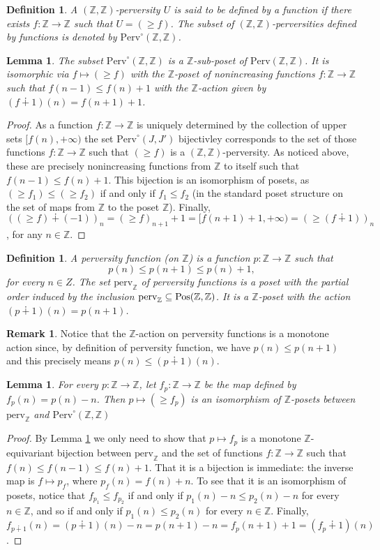 \documentclass{article}
\newtheorem{lem}[thm]{Lemma}
\newtheorem{defn}[thm]{Definition}
\theoremstyle{definition}
\newtheorem{rem}[thm]{Remark}
\newcommand{\Z}{\mathbb{Z}}
\newcommand{\pos}{\textnormal{Pos}}
\begin{document}
\begin{defn}
A $(\Z,\Z)$-perversity $U$ is said to be defined by a function if there exists $f\colon \Z\to \Z$ such that $U=(\geq f)$. The subset of $(\Z,\Z)$-perversities defined by functions is denoted by $\mathrm{Perv}^\circ(\Z,\Z)$.
\end{defn}
\begin{lem}\label{lemma.perv0}
The subset $\mathrm{Perv}^\circ(\Z,\Z)$ is a $\Z$-sub-poset of $\mathrm{Perv}(\Z,\Z)$. It is isomorphic via $f\mapsto (\geq f)$ with the $\Z$-poset of nonincreasing functions $f\colon \Z\to \Z$ such that $f(n-1)\leq f(n)+1$ with the $\Z$-action given by $(f\dotplus 1)(n)=f(n+1)+1$.
\end{lem}
\begin{proof}
As a function $f\colon \Z\to \Z$ is uniquely determined by the collection of upper sets $[f(n),+\infty)$ the set $\mathrm{Perv}^\circ(J,J')$ bijectivley corresponds to the set of those functions $f\colon \Z\to \Z$ such that $(\geq f)$ is a $(\Z,\Z)$-perversity. As noticed above, these are precisely nonincreasing functions from $\Z$ to itself such that  $f(n-1)\leq f(n)+1$. This bijection is an isomorphism of posets, as $(\geq f_1)\leq (\geq f_2)$ if and only if $f_1\leq f_2$ (in the standard poset structure on the set of maps from $\Z$ to the poset $\Z$). Finally, $((\geq f)\dotplus (-1))_n=(\geq f)_{n+1}+1=[f(n+1)+1,+\infty)=(\geq (f\dotplus 1))_n$, for any $n\in \Z$.
\end{proof}

\begin{defn}
A \emph{perversity function} (on $\Z$) is a function $p\colon \Z\to \Z$ such that
\[
p(n)\leq p(n+1)\leq p(n)+1,
\]
for every $n\in Z$. The set $\mathrm{perv}_\Z$ of perversity functions is a poset with the partial order induced by the inclusion $\mathrm{perv}_\Z\subseteq \pos(\Z,\Z)$. It is a $\Z$-poset with the action $(p\dotplus1)(n)=p(n+1)$. 
\end{defn}
\begin{rem}
Notice that the $\Z$-action on perversity functions is a monotone action since, by definition of perversity function, we have $p(n)\leq p(n+1)$ and this precisely means $p(n)\leq (p\dotplus1)(n)$.
\end{rem}
\begin{lem}
For every $p\colon \Z \to \Z$, let $f_p\colon \Z\to \Z$ be the map defined by $f_p(n)= p(n)-n$. Then $p\mapsto (\geq f_p)$ is an isomorphism of $\Z$-posets between $\mathrm{perv}_\Z$ and $\mathrm{Perv}^\circ(\Z,\Z)$
\end{lem}
\begin{proof}
By Lemma \ref{lemma.perv0} we only need to show that $p\mapsto f_p$ is a monotone $\Z$-equivariant bijection between  $\mathrm{perv}_\Z$ and the set of functions $f\colon \Z\to \Z$ such that $f(n)\leq f(n-1)\leq f(n)+1$. That it is a bijection is immediate: the inverse map is $f\mapsto p_f$, where $p_f(n)=f(n)+n$. To see that it is an isomorphism of posets, notice that $f_{p_1}\leq f_{p_2}$ if and only if $p_1(n)-n\leq p_2(n)-n$ for every $n\in \Z$, and so if and only if $p_1(n)\leq p_2(n)$ for every $n\in \Z$. Finally, $f_{p\dotplus1}(n)=(p\dotplus 1)(n)-n=p(n+1)-n=f_p(n+1)+1=(f_p\dotplus 1)(n)$.
\end{proof}
\end{document}
